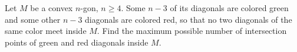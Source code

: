 Let $M$ be a convex $n$-gon, $n \geq 4$. Some $n - 3$ of its diagonals are colored green and some other $n - 3$ diagonals are colored red, so that no two diagonals of the same color meet inside $M$. Find the maximum possible number of intersection points of green and red diagonals inside $M$.
